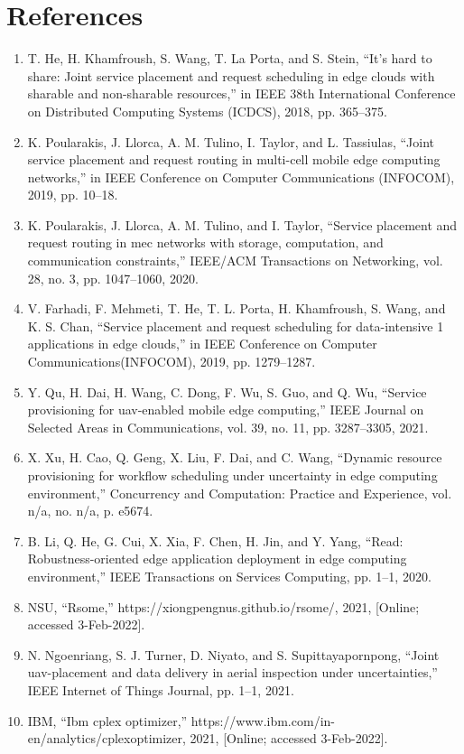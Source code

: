 \documentclass{article}
\begin{document}
\section{References}
\begin{enumerate}
\item
T. He, H. Khamfroush, S. Wang, T. La Porta, and S. Stein, “It’s hard to
share: Joint service placement and request scheduling in edge clouds with
sharable and non-sharable resources,” in IEEE 38th International Conference on Distributed
Computing Systems (ICDCS), 2018, pp. 365–375.
\item
K. Poularakis, J. Llorca, A. M. Tulino, I. Taylor, and L. Tassiulas, “Joint
service placement and request routing in multi-cell mobile edge computing networks,” in
IEEE Conference on Computer Communications (INFOCOM), 2019, pp. 10–18.
\item
K. Poularakis, J. Llorca, A. M. Tulino, and I. Taylor, “Service placement
and request routing in mec networks with storage, computation, and communication
constraints,” IEEE/ACM Transactions on Networking, vol. 28,
no. 3, pp. 1047–1060, 2020.
\item
V. Farhadi, F. Mehmeti, T. He, T. L. Porta, H. Khamfroush, S. Wang, and
K. S. Chan, “Service placement and request scheduling for data-intensive 1
applications in edge clouds,” in IEEE Conference on Computer
Communications(INFOCOM), 2019, pp. 1279–1287.
\item
Y. Qu, H. Dai, H. Wang, C. Dong, F. Wu, S. Guo, and Q. Wu, “Service
provisioning for uav-enabled mobile edge computing,” IEEE Journal on
Selected Areas in Communications, vol. 39, no. 11, pp. 3287–3305, 2021.
\item
X. Xu, H. Cao, Q. Geng, X. Liu, F. Dai, and C. Wang, “Dynamic resource
provisioning for workflow scheduling under uncertainty in edge computing
environment,” Concurrency and Computation: Practice and Experience,
vol. n/a, no. n/a, p. e5674.
\item
B. Li, Q. He, G. Cui, X. Xia, F. Chen, H. Jin, and Y. Yang, “Read:
Robustness-oriented edge application deployment in edge computing environment,” IEEE
Transactions on Services Computing, pp. 1–1, 2020.
\item
NSU, “Rsome,” https://xiongpengnus.github.io/rsome/, 2021, [Online; accessed 3-Feb-2022].
\item
N. Ngoenriang, S. J. Turner, D. Niyato, and S. Supittayapornpong, “Joint
uav-placement and data delivery in aerial inspection under uncertainties,”
IEEE Internet of Things Journal, pp. 1–1, 2021.
\item
IBM, “Ibm cplex optimizer,” https://www.ibm.com/in-en/analytics/cplexoptimizer, 2021,
[Online; accessed 3-Feb-2022].
\end{enumerate}
\end{document}
